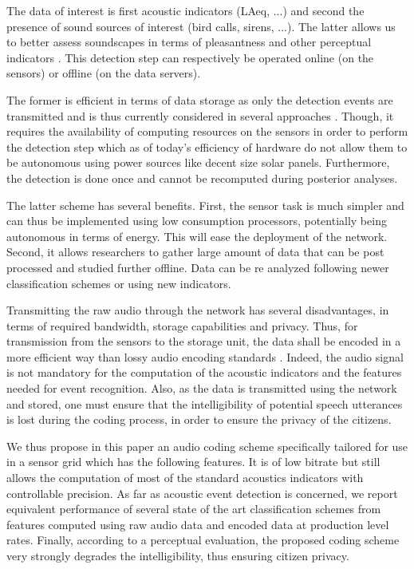 \documentclass[final,3p,times,twocolumn]{elsarticle}
\begin{document}
The data of interest is first acoustic indicators (LAeq, ...) and second the presence of sound sources of interest (bird calls, sirens, ...). The latter allows us to better assess soundscapes in terms of pleasantness and other perceptual indicators \cite{lavandier2006contribution, aumond2017modeling}. This detection step can respectively be operated online (on the sensors) or offline (on the data servers).

The former is efficient in terms of data storage as only the detection events are transmitted and is thus currently considered in several approaches \cite{defreville2006automatic, mydlarz2017implementation, mydlarz2015design}. Though, it requires the availability of computing resources on the sensors in order to perform the detection step which as of today's efficiency of hardware do not allow them to be autonomous using power sources like decent size solar panels. Furthermore, the detection is done once and cannot be recomputed during posterior analyses.

The latter scheme has several benefits. First, the sensor task is much simpler and can thus be implemented using low consumption processors, potentially being autonomous in terms of energy. This will ease the deployment of the network. Second, it allows researchers to gather large amount of data that can be post processed and studied further offline. Data can be re analyzed following newer classification schemes or using new indicators.

Transmitting the raw audio through the network has several disadvantages, in terms of required bandwidth, storage capabilities and privacy. Thus, for transmission from the sensors to the storage unit, the data shall be encoded in a more efficient way than lossy audio encoding standards \cite{pan1995tutorial}. Indeed, the audio signal is not mandatory for the computation of the acoustic indicators and the features needed for event recognition. Also, as the data is transmitted using the network and stored, one must ensure that the intelligibility of potential speech utterances is lost during the coding process, in order to ensure the privacy of the citizens.

We thus propose in this paper an audio coding scheme specifically tailored for use in a sensor grid which has the following features. It is of low bitrate but still allows the computation of most of the standard acoustics indicators with controllable precision. As far as acoustic event detection is concerned, we report equivalent performance of several state of the art classification schemes from features computed using raw audio data and encoded data at production level rates. Finally, according to a perceptual evaluation, the proposed coding scheme very strongly degrades the intelligibility, thus ensuring citizen privacy.
\end{document}
